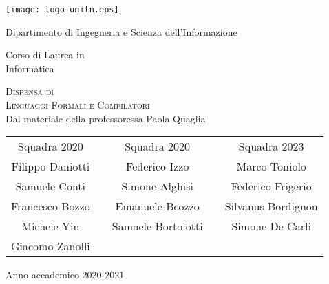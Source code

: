 \documentclass[class=book, crop=false, oneside]{standalone}
\begin{document}
\begin{titlepage}
	\centering
	\texttt{[image: logo-unitn.eps]}

	\vspace{1.3cm}
	\LARGE{Dipartimento di Ingegneria e Scienza dell'Informazione\\}

	\vspace{.9cm}
	\Large{Corso di Laurea in\\ Informatica}

	\vspace{.9cm}
	\Huge\textsc{Dispensa di\\Linguaggi Formali e Compilatori\\}
	\vspace{.2cm}
	\large{Dal materiale della professoressa Paola Quaglia}

	\vspace{1.8cm}
	\begin{tabularx}{\textwidth}{cXcXc}
		\Large{Squadra 2020} && \Large{Squadra 2020} && \Large{Squadra 2023} \\
		\cmidrule(lr){1-1} \cmidrule(lr){3-3} \cmidrule(lr){5-5}
		\large{Filippo Daniotti} && \large{Federico Izzo} && \large{Marco Toniolo}  \\
		\large{Samuele Conti} && \large{Simone Alghisi} &&  \large{Federico Frigerio}\\
		\large{Francesco Bozzo} && \large{Emanuele Beozzo} && \large{Silvanus Bordignon} \\
		\large{Michele Yin} && \large{Samuele Bortolotti} && \large{Simone De Carli}\\
		\large{Giacomo Zanolli} && && \\
	\end{tabularx}

	\vspace{1.4cm}
	\LARGE{Anno accademico 2020-2021}
\end{titlepage}
\end{document}
